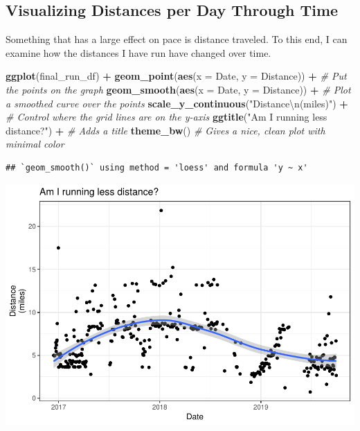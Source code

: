 \documentclass[]{article}
\newenvironment{Shaded}{\begin{snugshade}}{\end{snugshade}}
\newcommand{\CharTok}[1]{\textcolor[rgb]{0.31,0.60,0.02}{#1}}
\newcommand{\CommentTok}[1]{\textcolor[rgb]{0.56,0.35,0.01}{\textit{#1}}}
\newcommand{\DataTypeTok}[1]{\textcolor[rgb]{0.13,0.29,0.53}{#1}}
\newcommand{\KeywordTok}[1]{\textcolor[rgb]{0.13,0.29,0.53}{\textbf{#1}}}
\newcommand{\NormalTok}[1]{#1}
\newcommand{\OperatorTok}[1]{\textcolor[rgb]{0.81,0.36,0.00}{\textbf{#1}}}
\newcommand{\StringTok}[1]{\textcolor[rgb]{0.31,0.60,0.02}{#1}}
\begin{document}
\hypertarget{visualizing-distances-per-day-through-time}{%
\subsection{Visualizing Distances per Day Through
Time}\label{visualizing-distances-per-day-through-time}}

Something that has a large effect on pace is distance traveled. To this
end, I can examine how the distances I have run have changed over time.

\begin{Shaded}
\begin{Highlighting}[]
\KeywordTok{ggplot}\NormalTok{(final_run_df) }\OperatorTok{+}
\StringTok{  }\KeywordTok{geom_point}\NormalTok{(}\KeywordTok{aes}\NormalTok{(}\DataTypeTok{x =}\NormalTok{ Date, }\DataTypeTok{y =}\NormalTok{ Distance)) }\OperatorTok{+}\StringTok{ }\CommentTok{# Put the points on the graph}
\StringTok{  }\KeywordTok{geom_smooth}\NormalTok{(}\KeywordTok{aes}\NormalTok{(}\DataTypeTok{x =}\NormalTok{ Date, }\DataTypeTok{y =}\NormalTok{ Distance)) }\OperatorTok{+}\StringTok{ }\CommentTok{# Plot a smoothed curve over the points}
\StringTok{  }\KeywordTok{scale_y_continuous}\NormalTok{(}\StringTok{"Distance}\CharTok{\textbackslash{}n}\StringTok{(miles)"}\NormalTok{) }\OperatorTok{+}\StringTok{ }\CommentTok{# Control where the grid lines are on the y-axis}
\StringTok{  }\KeywordTok{ggtitle}\NormalTok{(}\StringTok{"Am I running less distance?"}\NormalTok{) }\OperatorTok{+}\StringTok{ }\CommentTok{# Adds a title}
\StringTok{  }\KeywordTok{theme_bw}\NormalTok{() }\CommentTok{# Gives a nice, clean plot with minimal color}
\end{Highlighting}
\end{Shaded}

\begin{verbatim}
## `geom_smooth()` using method = 'loess' and formula 'y ~ x'
\end{verbatim}

\includegraphics{my_running_data_files/figure-latex/unnamed-chunk-5-1.pdf}
\end{document}
